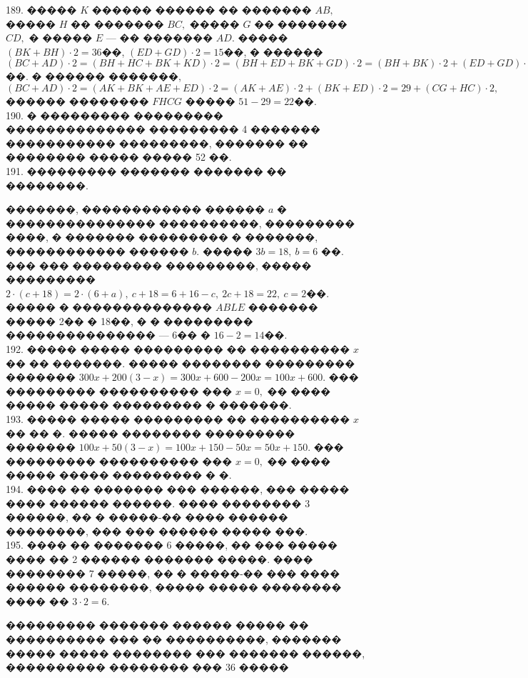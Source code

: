 \documentclass[12pt]{article}
\begin{document}
189. ����� $K$ ������ ������ �� ������� $AB,$ ����� $H$ �� ������� $BC,$ ����� $G$ �� ������� $CD,$ � ����� $E$ --- �� ������� $AD.$ ����� $(BK+BH)\cdot2=36$��, $(ED+GD)\cdot2=15$��, � ������ $(BC+AD)\cdot2=(BH+HC+BK+KD)\cdot2=(BH+ED+BK+GD)\cdot2=(BH+BK)\cdot2+(ED+GD)\cdot2=36+15=51$��. � ������ �������, $(BC+AD)\cdot2=(AK+BK+AE+ED)\cdot2=(AK+AE)\cdot2+(BK+ED)\cdot2=29+(CG+HC)\cdot2,$ ������ �������� $FHCG$ ����� $51-29=22$��.\\
190. � ��������� ��������� �������������� ��������� 4 ������� ����������� ���������, ������� �� �������� ����� ����� 52 ��.\\
191. ��������� ������� ������� �� ��������.
\begin{center}
\begin{figure}[ht!]
\end{figure}
\end{center}
�������, ������������ ������ $a$ � ��������������� ����������, ��������� ����, � ������� ��������� � �������, ������������ ������ $b.$ ����� $3b=18,\ b=6$ ��. ��� ��� ��������� ���������, ����� ��������� $2\cdot(c+18)=2\cdot(6+a),\ c+18=6+16-c,\ 2c+18=22,\ c=2$��. ����� � �������������� $ABLE$ ������� ����� 2�� � 18��, � � ��������� ��������������� --- 6�� � $16-2=14$��.\\
192. ����� ����� ��������� �� ���������� $x$�� �� �������. ����� �������� ��������� ������� $300x+200(3-x)=300x+600-200x=100x+600.$ ��� ��������� ���������� ��� $x=0,$ �� ���� ����� ����� ��������� � �������.\\
193. ����� ����� ��������� �� ���������� $x$�� �� �. ����� �������� ��������� ������� $100x+50(3-x)=100x+150-50x=50x+150.$ ��� ��������� ���������� ��� $x=0,$ �� ���� ����� ����� ��������� � �.\\
194. ���� �� ������� ��� ������, ��� ����� ���� ������ ������. ���� �������� 3 ������, �� � �����-�� ���� ������ ��������, ��� ��� ������ ����� ���.\\
195. ���� �� ������� 6 �����, �� ��� ����� ���� �� 2 ������ ������� �����. ���� �������� 7 �����, �� � �����-�� ��� ���� ������ ��������, ����� ����� �������� ���� �� $3\cdot2=6.$

��������� ������� ������ ����� �� ���������� ��� �� ����������, ������� ����� ����� �������� ��� ������� ������, ���������� �������� ��� 36 �����
\end{document}
